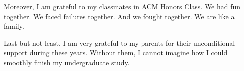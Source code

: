\begin{thanks}
    Moreover, I am grateful to my classmates in ACM Honors Class.
    We had fun together. We faced failures together. And we fought together.
    We are like a family.

    Last but not least, I am very grateful to my parents for their unconditional support during these years.
    Without them, I cannot imagine how I could smoothly finish my undergraduate study.

    

\end{thanks}
